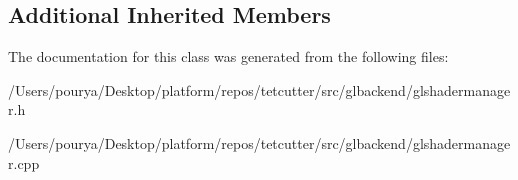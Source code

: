 \subsection*{Additional Inherited Members}


The documentation for this class was generated from the following files\+:\begin{DoxyCompactItemize}
\item 
/\+Users/pourya/\+Desktop/platform/repos/tetcutter/src/glbackend/glshadermanager.\+h\item 
/\+Users/pourya/\+Desktop/platform/repos/tetcutter/src/glbackend/glshadermanager.\+cpp\end{DoxyCompactItemize}
